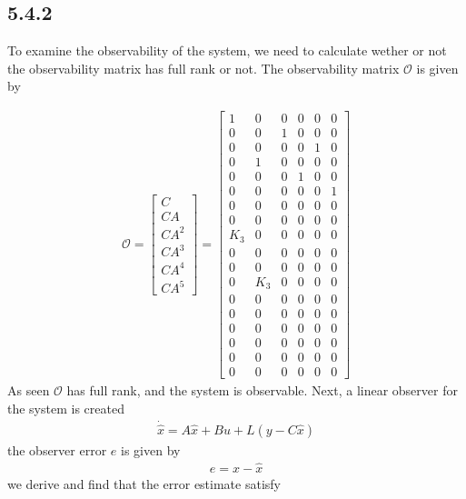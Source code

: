 \newpage
{}
\subsection*{5.4.2}
To examine the observability of the system, we need to calculate wether or not the observability matrix has full rank or not. The observability matrix $\mathcal{O}$ is given by

\begin{align*}
\mathcal{O} = \begin{bmatrix}
C\\
CA\\
CA^2\\
CA^3\\
CA^4\\
CA^5
\end{bmatrix}
=
\begin{bmatrix}
1 & 0 & 0 & 0 & 0 & 0\\
0 & 0 & 1 & 0 & 0 & 0\\
0 & 0 & 0 & 0 & 1 & 0\\
0 & 1 & 0 & 0 & 0 & 0\\
0 & 0 & 0 & 1 & 0 & 0\\
0 & 0 & 0 & 0 & 0 & 1\\
0 & 0 & 0 & 0 & 0 & 0\\
0 & 0 & 0 & 0 & 0 & 0\\
K_3 & 0 & 0 & 0 & 0 & 0\\
0 & 0 & 0 & 0 & 0 & 0\\
0 & 0 & 0 & 0 & 0 & 0\\
0 & K_3 & 0 & 0 & 0 & 0\\
0 & 0 & 0 & 0 & 0 & 0\\
0 & 0 & 0 & 0 & 0 & 0\\
0 & 0 & 0 & 0 & 0 & 0\\
0 & 0 & 0 & 0 & 0 & 0\\
0 & 0 & 0 & 0 & 0 & 0\\
0 & 0 & 0 & 0 & 0 & 0
\end{bmatrix}
\end{align*}
As seen $\mathcal{O}$ has full rank, and the system is observable. Next, a linear observer for the system is created
\begin{align*}
\dot{\hat{x}} = A\hat{x} + Bu + L(y - C\hat{x})
\end{align*}
the observer error $e$ is given by
\begin{align*}
e =  x -\hat{x}
\end{align*}
we derive and find that the error estimate satisfy
